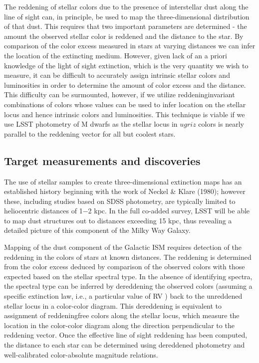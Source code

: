 The reddening of stellar colors due to the presence of interstellar dust along the line of sight can,
in principle, be used to map the three-dimensional distribution of that dust. This requires that
two important parameters are determined - the amount the observed stellar color is reddened and
the distance to the star. By comparison of the color excess measured in stars at varying distances
we can infer the location of the extincting medium. However, given lack of an a priori knowledge
of the light of sight extinction, which is the very quantity we wish to measure, it can be difficult
to accurately assign intrinsic stellar colors and luminosities in order to determine the amount of
color excess and the distance. This difficulty can be surmounted, however, if we utilize reddeninginvariant
combinations of colors whose values can be used to infer location on the stellar locus
and hence intrinsic colors and luminosities. This technique is viable if we use LSST photometry of
M dwarfs as the stellar locus in $ugriz$ colors is nearly parallel to the reddening vector for all but
coolest stars.



\subsection{Target measurements and discoveries}
\label{sec:\secname:targets}

The use of stellar samples to create three-dimensional extinction maps has an established history
beginning with the work of Neckel \& Klare (1980); however these, including studies based on SDSS
photometry, are typically limited to heliocentric distances of 1−2 kpc. In the full co-added survey,
LSST will be able to map dust structures out to distances exceeding 15 kpc, thus revealing a
detailed picture of this component of the Milky Way Galaxy.

Mapping of the dust component of the Galactic ISM requires detection of the reddening in the
colors of stars at known distances. The reddening is determined from the color excess deduced
by comparison of the observed colors with those expected based on the stellar spectral type. In
the absence of identifying spectra, the spectral type can be inferred by dereddening the observed
colors (assuming a specific extinction law, i.e., a particular value of RV ) back to the unreddened
stellar locus in a color-color diagram. This dereddening is equivalent to assignment of reddeningfree
colors along the stellar locus, which measure the location in the color-color diagram along
the direction perpendicular to the reddening vector. Once the effective line of sight reddening has
been computed, the distance to each star can be determined using dereddened photometry and
well-calibrated color-absolute magnitude relations.

